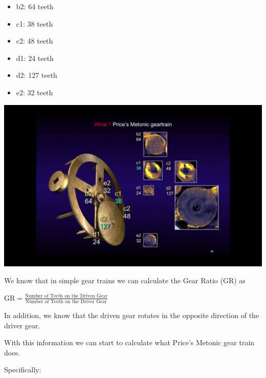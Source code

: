 \documentclass{article}
\theoremstyle{definition}
\begin{document}
\bigskip
\bigskip
\begin{minipage}[c]{0.45\textwidth}
  \begin{itemize}
    \item b2: 64 teeth
    \item c1: 38 teeth
    \item c2: 48 teeth
    \item d1: 24 teeth
    \item d2: 127 teeth
    \item e2: 32 teeth
  \end{itemize}
\end{minipage}
\hfill
\begin{minipage}[c]{0.55\textwidth}
  \includegraphics[width=\textwidth,cfbox=red]{images/price_metonic_gear_train.png}
\end{minipage}

\bigskip
\bigskip
\noindent
We know that in simple gear trains we can calculate the Gear
Ratio (GR) as  


\bigskip
\begin{center}
{\Large $\text{GR} = \frac{\text{Number of Teeth on the Driven
Gear}}{\text{Number of Teeth on the Driver Gear}}$} 
\vspace{6mm}
\end{center}

\noindent
In addition, we know that the driven gear rotates in the opposite
direction of the driver gear.  


\bigskip
\noindent
With this information we can start to calculate what Price's
Metonic gear train does.  

\bigskip
\noindent
Specifically:
\end{document}
